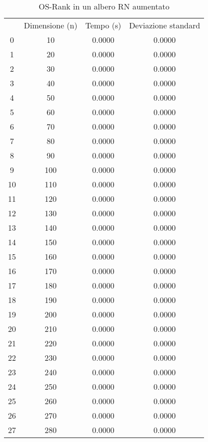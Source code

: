 \begin{table}
\centering
\caption{OS-Rank in un albero RN aumentato}
\label{OS-Rank in un albero RN aumentato}
\begin{adjustbox}{width=1\textwidth/2}
\begin{tabular}{|c|c|c|c|}
\hline
 & Dimensione (n) & Tempo (s) & Deviazione standard \\
0 & 10 & 0.0000 & 0.0000 \\
\cline{1-4}
1 & 20 & 0.0000 & 0.0000 \\
\cline{1-4}
2 & 30 & 0.0000 & 0.0000 \\
\cline{1-4}
3 & 40 & 0.0000 & 0.0000 \\
\cline{1-4}
4 & 50 & 0.0000 & 0.0000 \\
\cline{1-4}
5 & 60 & 0.0000 & 0.0000 \\
\cline{1-4}
6 & 70 & 0.0000 & 0.0000 \\
\cline{1-4}
7 & 80 & 0.0000 & 0.0000 \\
\cline{1-4}
8 & 90 & 0.0000 & 0.0000 \\
\cline{1-4}
9 & 100 & 0.0000 & 0.0000 \\
\cline{1-4}
10 & 110 & 0.0000 & 0.0000 \\
\cline{1-4}
11 & 120 & 0.0000 & 0.0000 \\
\cline{1-4}
12 & 130 & 0.0000 & 0.0000 \\
\cline{1-4}
13 & 140 & 0.0000 & 0.0000 \\
\cline{1-4}
14 & 150 & 0.0000 & 0.0000 \\
\cline{1-4}
15 & 160 & 0.0000 & 0.0000 \\
\cline{1-4}
16 & 170 & 0.0000 & 0.0000 \\
\cline{1-4}
17 & 180 & 0.0000 & 0.0000 \\
\cline{1-4}
18 & 190 & 0.0000 & 0.0000 \\
\cline{1-4}
19 & 200 & 0.0000 & 0.0000 \\
\cline{1-4}
20 & 210 & 0.0000 & 0.0000 \\
\cline{1-4}
21 & 220 & 0.0000 & 0.0000 \\
\cline{1-4}
22 & 230 & 0.0000 & 0.0000 \\
\cline{1-4}
23 & 240 & 0.0000 & 0.0000 \\
\cline{1-4}
24 & 250 & 0.0000 & 0.0000 \\
\cline{1-4}
25 & 260 & 0.0000 & 0.0000 \\
\cline{1-4}
26 & 270 & 0.0000 & 0.0000 \\
\cline{1-4}
27 & 280 & 0.0000 & 0.0000 \\

\end{tabular}
\end{adjustbox}
\end{table}
